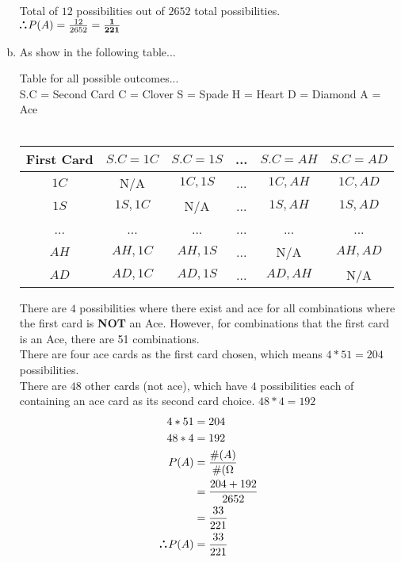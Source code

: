 \documentclass[10pt]{report}
\def\therefore{\boldsymbol{\text{ }
\leavevmode
\lower0.4ex\hbox{$\cdot$}
\kern-.5em\raise0.7ex\hbox{$\cdot$}
\kern-0.6em\lower0.4ex\hbox{$\cdot$}
\thinspace\text{ }}}
\begin{document}
\begin{enumerate}[(a)]
\begin{center}
 Total of $12 $ possibilities out of $2652 $ total possibilities. \\
$ \therefore P(A) = \frac{12}{2652} = \mathbf{\frac{1}{221}} $
 \end{center}
 \item As show in the following table...
 \begin{center}
 Table for all possible outcomes... \\
 \footnotesize{ S.C = Second Card }
 \footnotesize{ C = Clover }
 \footnotesize{ S = Spade}
 \footnotesize{ H = Heart}
 \footnotesize{ D = Diamond} 
 \footnotesize{ A = Ace } \\ 
 \ \\
 \begin{tabular}{ |c|c|c|c|c|c| }
 \hline
First Card &  $S.C = 1C$ & $S.C = 1S$ & ... & $S.C = AH$ & $S.C = AD$ \\
\hline
$1C$ & N/A & $1C, 1S$ & ... & $1C, AH$ & $1C, AD$  \\
\hline
$1S$ & $1S, 1C $ & N/A & ... & $1S, AH$ & $1S, AD $ \\
\hline
... & ... & ... & ... & ... & ... \\
\hline
$AH$ & $AH, 1C$ & $AH, 1S$ & ... & N/A & $AH, AD $ \\
\hline
$AD$ & $AD, 1C$ & $AD, 1S$ & ... & $AD, AH$ & N/A \\
\hline
 \end{tabular}
 \end{center}
 There are $4 $ possibilities where there exist and ace for all combinations where the first card is \textbf{NOT} an Ace. However, for combinations that the first card is an Ace, there are 51 combinations. \\
 There are four ace cards as the first card chosen, which means $4 * 51 = 204 $ possibilities.\\
 There are $48$ other cards (not ace), which have $4 $ possibilities each of containing an ace card as its second card choice. $48 * 4 = 192 $
 \begin{align*}
 4*51 &= 204 \\
 48*4 &= 192 \\
 P(A) &= \frac{\#(A)}{\#(\Omega} \\
 &= \frac{204+192}{2652} \\
 &= \frac{33}{221} \\
 \therefore P(A) & = \frac{33}{221} \\
 \end{align*}
 \end{enumerate}
\end{document}
